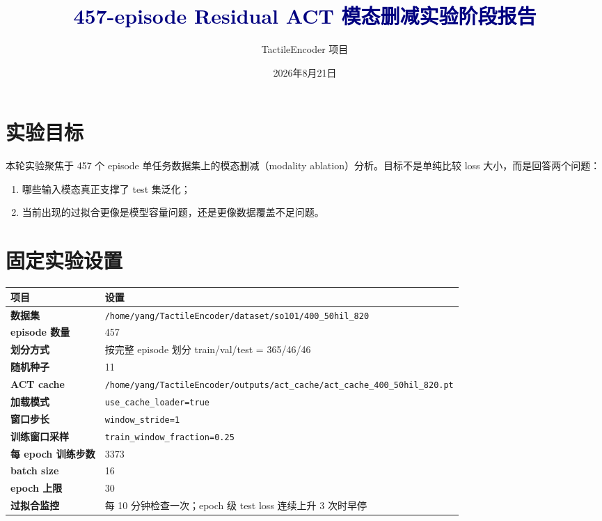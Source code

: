 \documentclass[UTF8,a4paper,11pt,fontset=none]{ctexart}
\title{\textcolor{navy}{457-episode Residual ACT 模态删减实验阶段报告}}
\author{TactileEncoder 项目}
\date{2026年8月21日}
\begin{document}
\maketitle
\thispagestyle{empty}

\begin{center}
\end{center}

\section{实验目标}
本轮实验聚焦于 457 个 episode 单任务数据集上的模态删减（modality ablation）分析。目标不是单纯比较 loss 大小，而是回答两个问题：
\begin{enumerate}
\item 哪些输入模态真正支撑了 test 集泛化；
\item 当前出现的过拟合更像是模型容量问题，还是更像数据覆盖不足问题。
\end{enumerate}

\section{固定实验设置}
\begin{tabularx}{\textwidth}{>{\bfseries}p{}Y}
\toprule
项目 & 设置 \\
\midrule
数据集 & \texttt{/home/yang/TactileEncoder/dataset/so101/400\_50hil\_820} \\
episode 数量 & 457 \\
划分方式 & 按完整 episode 划分 train/val/test = 365/46/46 \\
随机种子 & 11 \\
ACT cache & \texttt{/home/yang/TactileEncoder/outputs/act\_cache/act\_cache\_400\_50hil\_820.pt} \\
加载模式 & \texttt{use\_cache\_loader=true} \\
窗口步长 & \texttt{window\_stride=1} \\
训练窗口采样 & \texttt{train\_window\_fraction=0.25} \\
每 epoch 训练步数 & 3373 \\
batch size & 16 \\
epoch 上限 & 30 \\
过拟合监控 & 每 10 分钟检查一次；epoch 级 test loss 连续上升 3 次时早停 \\
\bottomrule
\end{tabularx}
\end{document}
